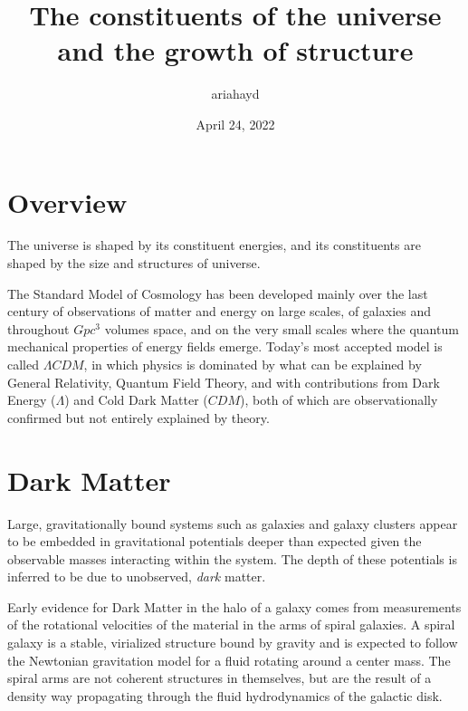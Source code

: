 \documentclass{paper}
\begin{document}
 

\title{The constituents of the universe and the growth of structure}
\author{ariahayd}
\date{April 24, 2022}
\maketitle

\section{Overview}
  The universe is shaped by its constituent energies, and its constituents are
  shaped by the size and structures of universe.

  The Standard Model of Cosmology has been developed mainly over the last
  century of observations of matter and energy on large scales, of galaxies
  and throughout \(Gpc^3\) volumes space, and on the very small scales where
  the quantum mechanical properties of energy fields emerge. Today's most
  accepted model is called \(\Lambda CDM\), in which physics is dominated by
  what can be explained by General Relativity, Quantum Field Theory, and
  with contributions from Dark Energy (\(\Lambda\)) and Cold Dark Matter 
  (\(CDM\)), both of which are observationally confirmed but not entirely
  explained by theory.

\section{Dark Matter}
  Large, gravitationally bound systems such as galaxies and galaxy clusters 
  appear to be embedded in gravitational potentials deeper than expected given 
  the observable masses interacting within the system. The depth of these 
  potentials is inferred to be due to unobserved, \textit{dark} matter.

  Early evidence for Dark Matter in the halo of a galaxy comes from
  measurements of the rotational velocities of the material in the arms of
  spiral galaxies. A spiral galaxy is a stable, virialized structure bound by
  gravity and is expected to follow the Newtonian gravitation model for a
  fluid rotating around a center mass. The spiral arms are not coherent
  structures in themselves, but are the result of a density way propagating 
  through the fluid hydrodynamics of the galactic disk. 
\end{document}
